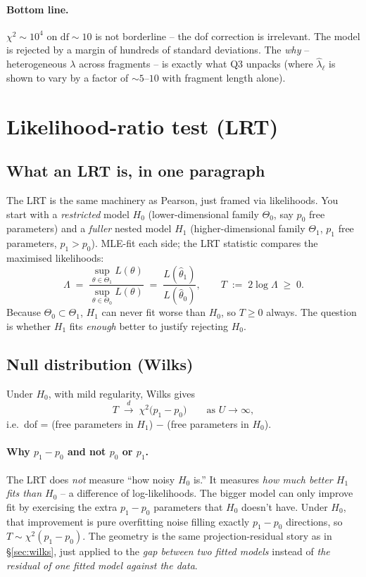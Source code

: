 \documentclass[11pt]{article}
\newcommand{\hlam}{\hat{\lambda}}
\begin{document}
\paragraph{Bottom line.}
$\chi^{2} \sim 10^{4}$ on $\mathrm{df} \sim 10$ is not borderline -- the
dof correction is irrelevant. The model is rejected by a margin of
hundreds of standard deviations. The \emph{why} -- heterogeneous
$\lambda$ across fragments -- is exactly what Q3 unpacks (where $\hlam_\ell$
is shown to vary by a factor of $\sim 5$--$10$ with fragment length alone).

\section{Likelihood-ratio test (LRT)}

\subsection{What an LRT is, in one paragraph}

The LRT is the same machinery as Pearson, just framed via likelihoods.
You start with a \emph{restricted} model $H_0$ (lower-dimensional family
$\Theta_0$, say $p_0$ free parameters) and a \emph{fuller} nested model
$H_1$ (higher-dimensional family $\Theta_1$, $p_1$ free parameters,
$p_1 > p_0$). MLE-fit each side; the LRT statistic compares the maximised
likelihoods:
\[
   \Lambda \;=\; \frac{\sup_{\theta \in \Theta_1} L(\theta)}
                     {\sup_{\theta \in \Theta_0} L(\theta)}
        \;=\; \frac{L(\hat\theta_1)}{L(\hat\theta_0)},
   \qquad
   T \;:=\; 2 \log \Lambda \;\geq\; 0.
\]
Because $\Theta_0 \subset \Theta_1$, $H_1$ can never fit worse than $H_0$,
so $T \geq 0$ always. The question is whether $H_1$ fits \emph{enough}
better to justify rejecting $H_0$.

\subsection{Null distribution (Wilks)}

Under $H_0$, with mild regularity, Wilks gives
\[
   T \;\overset{d}{\longrightarrow}\;
       \chi^{2}\bigl(p_1 - p_0\bigr) \qquad \text{as } U \to \infty,
\]
i.e.\ dof = (free parameters in $H_1$) $-$ (free parameters in $H_0$).

\paragraph{Why $p_1 - p_0$ and not $p_0$ or $p_1$.}
The LRT does \emph{not} measure ``how noisy $H_0$ is.'' It measures
\emph{how much better $H_1$ fits than $H_0$} -- a difference of
log-likelihoods. The bigger model can only improve fit by exercising the
extra $p_1 - p_0$ parameters that $H_0$ doesn't have. Under $H_0$, that
improvement is pure overfitting noise filling exactly $p_1 - p_0$
directions, so $T \sim \chi^{2}(p_1 - p_0)$. The geometry is the same
projection-residual story as in \S\ref{sec:wilks}, just applied to the
\emph{gap between two fitted models} instead of \emph{the residual of one
fitted model against the data}.
\end{document}
